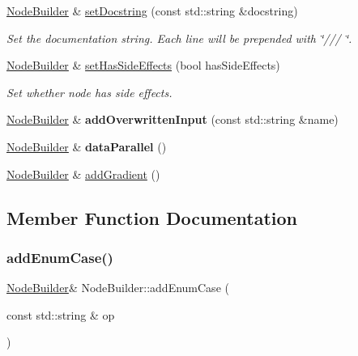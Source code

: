 \begin{DoxyCompactItemize}
\hyperlink{class_node_builder}{Node\+Builder} \& \hyperlink{class_node_builder_a15df8c1e24ddd6cc779cb4ed5e5eace2}{set\+Docstring} (const std\+::string \&docstring)
\begin{DoxyCompactList}\small\item\em Set the documentation string. Each line will be prepended with \char`\"{}/// \char`\"{}. \end{DoxyCompactList}\item 
\mbox{\label{class_node_builder_aca50d259f221a816ed5ca40b8df722f8}} 
\hyperlink{class_node_builder}{Node\+Builder} \& \hyperlink{class_node_builder_aca50d259f221a816ed5ca40b8df722f8}{set\+Has\+Side\+Effects} (bool has\+Side\+Effects)
\begin{DoxyCompactList}\small\item\em Set whether node has side effects. \end{DoxyCompactList}\item 
\mbox{\label{class_node_builder_a19694563b8a2728efda86842250805eb}} 
\hyperlink{class_node_builder}{Node\+Builder} \& {\bfseries add\+Overwritten\+Input} (const std\+::string \&name)
\item 
\mbox{\label{class_node_builder_aaebb1d48c9e4afaee820f623cafe2501}} 
\hyperlink{class_node_builder}{Node\+Builder} \& {\bfseries data\+Parallel} ()
\item 
\hyperlink{class_node_builder}{Node\+Builder} \& \hyperlink{class_node_builder_a12bc758e5d8a853e540bdfdcd9338ef4}{add\+Gradient} ()
\end{DoxyCompactItemize}


\subsection{Member Function Documentation}
\mbox{\label{class_node_builder_a971697859997389e6f2fe2a56d99267a}} 
\subsubsection{\texorpdfstring{add\+Enum\+Case()}{addEnumCase()}}
{\footnotesize\ttfamily \hyperlink{class_node_builder}{Node\+Builder}\& Node\+Builder\+::add\+Enum\+Case (\begin{DoxyParamCaption}\item[{const std\+::string \&}]{op }\end{DoxyParamCaption})\hspace{0.3cm}{\ttfamily [inline]}}

